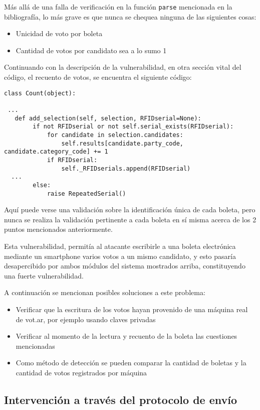Más allá de una falla de verificación en la función \texttt{parse} mencionada en la bibliografía, lo más grave es que nunca se chequea ninguna de las siguientes cosas\cite{multivoto}:
\begin{itemize}
	\item Unicidad de voto por boleta
	\item Cantidad de votos por candidato sea a lo sumo 1
\end{itemize}

Continuando con la descripción de la vulnerabilidad, en otra sección vital del código, el recuento de votos, se encuentra el siguiente código:

\begin{lstlisting}
class Count(object):

 ...
   def add_selection(self, selection, RFIDserial=None):
        if not RFIDserial or not self.serial_exists(RFIDserial):
            for candidate in selection.candidates:
                self.results[candidate.party_code, candidate.category_code] += 1
            if RFIDserial:
                self._RFIDserials.append(RFIDserial)
  ...
        else:
            raise RepeatedSerial()
\end{lstlisting}

Aquí puede verse una validación sobre la identificación única de cada boleta, pero nunca se realiza la validación pertinente a cada boleta en sí misma acerca de los 2 puntos mencionados anteriormente.

Esta vulnerabilidad, permitía al atacante escribirle a una boleta electrónica mediante un smartphone varios votos a un mismo candidato, y esto pasaría desapercibido por ambos módulos del sistema mostrados arriba, constituyendo una fuerte vulnerabilidad.

A continuación se mencionan posibles soluciones a este problema:
\begin{itemize}
	\item Verificar que la escritura de los votos hayan provenido de una máquina real de vot.ar, por ejemplo usando claves privadas
	\item Verificar al momento de la lectura y recuento de la boleta las cuestiones mencionadas
	\item Como método de detección se pueden comparar la cantidad de boletas y la cantidad de votos registrados por máquina
\end{itemize}


\subsection{Intervención a través del protocolo de envío}

